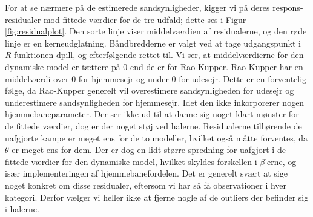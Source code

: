 \documentclass[11pt,a4paper]{article}
\begin{document}
For at se nærmere på de estimerede sandsynligheder, kigger vi på deres respons-residualer mod fittede værdier for de tre udfald; dette ses i Figur \ref{fig:residualplot}. Den sorte linje viser middelværdien af residualerne, og den røde linje er en kerneudglatning. Båndbredderne er valgt ved at tage udgangspunkt i \textit{R}-funktionen {\selectfont dpill}, og efterfølgende rettet til. Vi ser, at middelværdierne for den dynamiske model er tættere på 0 end de er for Rao-Kupper. Rao-Kupper har en middelværdi over 0 for hjemmesejr og under 0 for udesejr. Dette er en forventelig følge, da Rao-Kupper generelt vil overestimere sandsynligheden for udesejr og underestimere sandsynligheden for hjemmesejr. Idet den ikke inkorporerer nogen hjemmebaneparameter. Der ser ikke ud til at danne sig noget klart mønster for de fittede værdier, dog er der noget støj ved halerne. Residualerne tilhørende de uafgjorte kampe er meget ens for de to modeller, hvilket også måtte forventes, da $\theta$ er meget ens for dem. Der er dog en lidt større spredning for uafgjort i de fittede værdier for den dynamiske model, hvilket skyldes forskellen i $\beta$'erne, og især implementeringen af hjemmebanefordelen. Det er generelt svært at sige noget konkret om disse residualer, eftersom vi har så få observationer i hver kategori. Derfor vælger vi heller ikke at fjerne nogle af de outliers der befinder sig i halerne.
\end{document}
